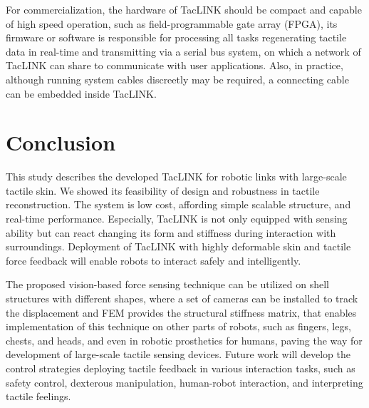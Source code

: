 \documentclass[10pt,letterpaper,journal,final,twoside,twocolumn,nofonttune]{IEEEtran}
\begin{document}
For commercialization, the hardware of TacLINK should be compact and capable of high speed operation, such as field-programmable gate array (FPGA), its firmware or software is responsible for processing all tasks regenerating tactile data in real-time and transmitting via a serial bus system, on which a network of TacLINK can share to communicate with user applications. Also, in practice, although running system cables discreetly may be required, a connecting cable can be embedded inside TacLINK.
\section{Conclusion}
This study describes the developed TacLINK for robotic links with large-scale tactile skin. We showed its feasibility of design and robustness in tactile reconstruction. The system is low cost, affording simple scalable structure, and real-time performance. Especially, TacLINK is not only equipped with sensing ability but can react changing its form and stiffness during interaction with surroundings. Deployment of TacLINK with highly deformable skin and tactile force feedback will enable robots to interact safely and intelligently.

The proposed vision-based force sensing technique can be utilized on shell structures with different shapes, where a set of cameras can be installed to track the displacement and FEM provides the structural stiffness matrix, that enables implementation of this technique on other parts of robots, such as fingers, legs, chests, and heads, and even in robotic prosthetics for humans, paving the way for development of large-scale tactile sensing devices.
Future work will develop the control strategies deploying tactile feedback in various interaction tasks, such as safety control, dexterous manipulation, human-robot interaction, and interpreting tactile feelings.
\end{document}
